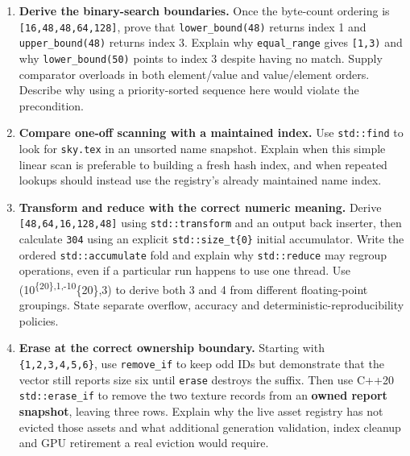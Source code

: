 \begin{enumerate}
  \textbf{Partition only when the task is binary membership.} Use \texttt{std::partition} to put mesh records before non-mesh records; verify both halves and use \texttt{partition\_point} on the resulting already-partitioned range. Explain why the two groups are not automatically sorted and why partitioning does not promise to retain original relative order. Say when \texttt{stable\_partition} would be appropriate.
\item
  \textbf{Derive the binary-search boundaries.} Once the byte-count ordering is \texttt{{[}16,48,48,64,128{]}}, prove that \texttt{lower\_bound(48)} returns index 1 and \texttt{upper\_bound(48)} returns index 3. Explain why \texttt{equal\_range} gives \texttt{{[}1,3)} and why \texttt{lower\_bound(50)} points to index 3 despite having no match. Supply comparator overloads in both element/value and value/element orders. Describe why using a priority-sorted sequence here would violate the precondition.
\item
  \textbf{Compare one-off scanning with a maintained index.} Use \texttt{std::find} to look for \texttt{sky.tex} in an unsorted name snapshot. Explain when this simple linear scan is preferable to building a fresh hash index, and when repeated lookups should instead use the registry's already maintained name index.
\item
  \textbf{Transform and reduce with the correct numeric meaning.} Derive \texttt{{[}48,64,16,128,48{]}} using \texttt{std::transform} and an output back inserter, then calculate \texttt{304} using an explicit \texttt{std::size\_t\{0\}} initial accumulator. Write the ordered \texttt{std::accumulate} fold and explain why \texttt{std::reduce} may regroup operations, even if a particular run happens to use one thread. Use (10\textsuperscript{\{20\},1,-10}\{20\},3) to derive both 3 and 4 from different floating-point groupings. State separate overflow, accuracy and deterministic-reproducibility policies.
\item
  \textbf{Erase at the correct ownership boundary.} Starting with \texttt{\{1,2,3,4,5,6\}}, use \texttt{remove\_if} to keep odd IDs but demonstrate that the vector still reports size six until \texttt{erase} destroys the suffix. Then use C++20 \texttt{std::erase\_if} to remove the two texture records from an \textbf{owned report snapshot}, leaving three rows. Explain why the live asset registry has not evicted those assets and what additional generation validation, index cleanup and GPU retirement a real eviction would require.
\end{enumerate}

